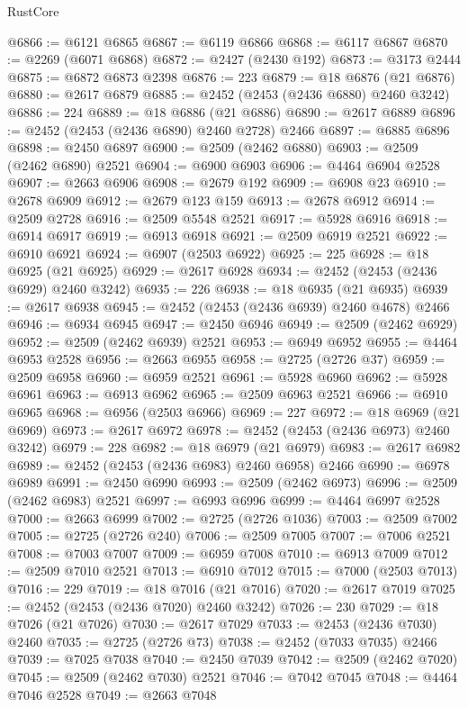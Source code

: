 \begin{lexlean}{RustCore}
\begin{coremodule}
@6866 := @6121 @6865
@6867 := @6119 @6866
@6868 := @6117 @6867
@6870 := @2269 (@6071 @6868)
@6872 := @2427 (@2430 @192)
@6873 := @3173 @2444
@6875 := @6872 @6873 @2398
@6876 := 223
@6879 := @18 @6876 (@21 @6876)
@6880 := @2617 @6879
@6885 := @2452 (@2453 (@2436 @6880) @2460 @3242)
@6886 := 224
@6889 := @18 @6886 (@21 @6886)
@6890 := @2617 @6889
@6896 := @2452 (@2453 (@2436 @6890) @2460 @2728) @2466
@6897 := @6885 @6896
@6898 := @2450 @6897
@6900 := @2509 (@2462 @6880)
@6903 := @2509 (@2462 @6890) @2521
@6904 := @6900 @6903
@6906 := @4464 @6904 @2528
@6907 := @2663 @6906
@6908 := @2679 @192
@6909 := @6908 @23
@6910 := @2678 @6909
@6912 := @2679 @123 @159
@6913 := @2678 @6912
@6914 := @2509 @2728
@6916 := @2509 @5548 @2521
@6917 := @5928 @6916
@6918 := @6914 @6917
@6919 := @6913 @6918
@6921 := @2509 @6919 @2521
@6922 := @6910 @6921
@6924 := @6907 (@2503 @6922)
@6925 := 225
@6928 := @18 @6925 (@21 @6925)
@6929 := @2617 @6928
@6934 := @2452 (@2453 (@2436 @6929) @2460 @3242)
@6935 := 226
@6938 := @18 @6935 (@21 @6935)
@6939 := @2617 @6938
@6945 := @2452 (@2453 (@2436 @6939) @2460 @4678) @2466
@6946 := @6934 @6945
@6947 := @2450 @6946
@6949 := @2509 (@2462 @6929)
@6952 := @2509 (@2462 @6939) @2521
@6953 := @6949 @6952
@6955 := @4464 @6953 @2528
@6956 := @2663 @6955
@6958 := @2725 (@2726 @37)
@6959 := @2509 @6958
@6960 := @6959 @2521
@6961 := @5928 @6960
@6962 := @5928 @6961
@6963 := @6913 @6962
@6965 := @2509 @6963 @2521
@6966 := @6910 @6965
@6968 := @6956 (@2503 @6966)
@6969 := 227
@6972 := @18 @6969 (@21 @6969)
@6973 := @2617 @6972
@6978 := @2452 (@2453 (@2436 @6973) @2460 @3242)
@6979 := 228
@6982 := @18 @6979 (@21 @6979)
@6983 := @2617 @6982
@6989 := @2452 (@2453 (@2436 @6983) @2460 @6958) @2466
@6990 := @6978 @6989
@6991 := @2450 @6990
@6993 := @2509 (@2462 @6973)
@6996 := @2509 (@2462 @6983) @2521
@6997 := @6993 @6996
@6999 := @4464 @6997 @2528
@7000 := @2663 @6999
@7002 := @2725 (@2726 @1036)
@7003 := @2509 @7002
@7005 := @2725 (@2726 @240)
@7006 := @2509 @7005
@7007 := @7006 @2521
@7008 := @7003 @7007
@7009 := @6959 @7008
@7010 := @6913 @7009
@7012 := @2509 @7010 @2521
@7013 := @6910 @7012
@7015 := @7000 (@2503 @7013)
@7016 := 229
@7019 := @18 @7016 (@21 @7016)
@7020 := @2617 @7019
@7025 := @2452 (@2453 (@2436 @7020) @2460 @3242)
@7026 := 230
@7029 := @18 @7026 (@21 @7026)
@7030 := @2617 @7029
@7033 := @2453 (@2436 @7030) @2460
@7035 := @2725 (@2726 @73)
@7038 := @2452 (@7033 @7035) @2466
@7039 := @7025 @7038
@7040 := @2450 @7039
@7042 := @2509 (@2462 @7020)
@7045 := @2509 (@2462 @7030) @2521
@7046 := @7042 @7045
@7048 := @4464 @7046 @2528
@7049 := @2663 @7048

\end{coremodule}
\end{lexlean}
